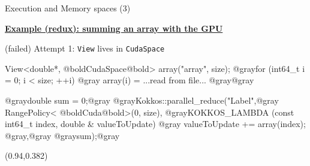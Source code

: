 \begin{frame}[fragile]{Execution and Memory spaces (3)}

  \ul{\textbf{Example (redux): summing an array with the GPU}}

  \vspace{7pt}

  \hspace{10pt}(failed) Attempt 1: \texttt{View} lives in \texttt{CudaSpace}

  \vspace{3pt}

  \begin{code}[linebackgroundcolor={
        \btLstHL<2->{3}{red!20}
      },
      keywords={}]
View<double*, @boldCudaSpace@bold> array("array", size);
@grayfor (int64_t i = 0; i < size; ++i) {@gray
  array(i) = ...read from file...
@gray}@gray

@graydouble sum = 0;@gray
@grayKokkos::parallel_reduce("Label",@gray
  RangePolicy< @boldCuda@bold>(0, size),
  @grayKOKKOS_LAMBDA (const int64_t index, double & valueToUpdate) {@gray
    valueToUpdate += array(index);
  @gray},@gray
  @graysum);@gray
  \end{code}

  \vspace{11pt}

  \begin{textblock*}{0.5\textwidth}(0.94\textwidth,0.382\textheight)
  \end{textblock*}

  \vspace{26pt}

\end{frame}


